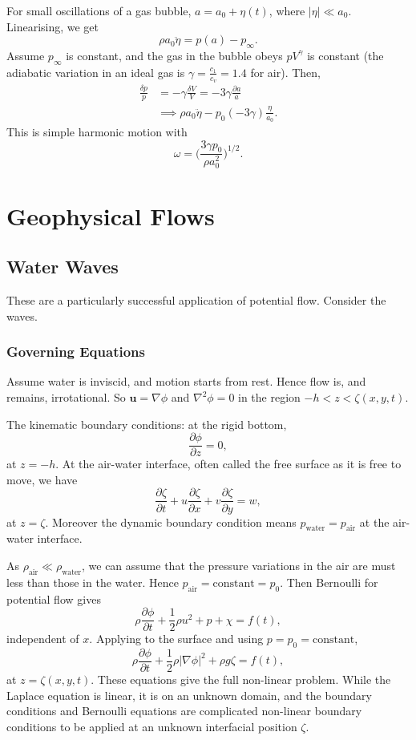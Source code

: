 \documentclass[12pt]{article}
\begin{document}
For small oscillations of a gas bubble, $a = a_0 + \eta(t)$, where $|\eta| \ll a_0$. Linearising, we get
\[
\rho a_0 \ddot \eta = p(a) - p_{\infty}.
\]
Assume $p_{\infty}$ is constant, and the gas in the bubble obeys $pV^{\gamma}$ is constant (the adiabatic variation in an ideal gas is $\gamma = \frac{c_1}{c_v} = 1.4$ for air). Then,
\begin{align*}
	\frac{\delta p}{p} &= - \gamma \frac{\delta V}{V} = - 3\gamma \frac{\partial a}{a} \\
			   &\implies \rho a_0 \ddot \eta - p_0(-3 \gamma) \frac{\eta}{a_0}.
\end{align*}
This is simple harmonic motion with
\[
\omega = \biggl(\frac{3 \gamma p_0}{\rho a_0^2}\biggr)^{1/2}.
\]

\newpage

\section{Geophysical Flows}
\label{sec:geophysical_flows}

\subsection{Water Waves}
\label{sub:water_waves}

These are a particularly successful application of potential flow. Consider the waves.

\subsubsection{Governing Equations}
\label{subsub:governing_equations}

Assume water is inviscid, and motion starts from rest. Hence flow is, and remains, irrotational. So $\mathbf{u} = \nabla \phi$ and $\nabla^2 \phi = 0$ in the region $-h < z < \zeta(x, y, t)$.

The kinematic boundary conditions: at the rigid bottom,
\[
\frac{\partial \phi}{\partial z} = 0,
\]
at $z = -h$. At the air-water interface, often called the free surface as it is free to move, we have
\[
\frac{\partial \zeta}{\partial t} + u \frac{\partial \zeta}{\partial x} + v \frac{\partial \zeta}{\partial y} = w,
\]
at $z = \zeta$. Moreover the dynamic boundary condition means $p_{\mathrm{water}} = p_{\mathrm{air}}$ at the air-water interface.

As $\rho_{\mathrm{air}} \ll \rho_{\mathrm{water}}$, we can assume that the pressure variations in the air are must less than those in the water. Hence $p_{\mathrm{air}} = \text{constant} = p_{0}$. Then Bernoulli for potential flow gives
\[
\rho \frac{\partial \phi}{\partial t} + \frac{1}{2} \rho u^2 + p + \chi = f(t),
\]
independent of $x$. Applying to the surface and using $p = p_0 = \text{constant}$,
\[
\rho \frac{\partial \phi}{\partial t} + \frac{1}{2} \rho |\nabla \phi|^2 + \rho g \zeta = f(t),
\]
at $z = \zeta(x, y, t)$. These equations give the full non-linear problem. While the Laplace equation is linear, it is on an unknown domain, and the boundary conditions and Bernoulli equations are complicated non-linear boundary conditions to be applied at an unknown interfacial position $\zeta$.
\end{document}
